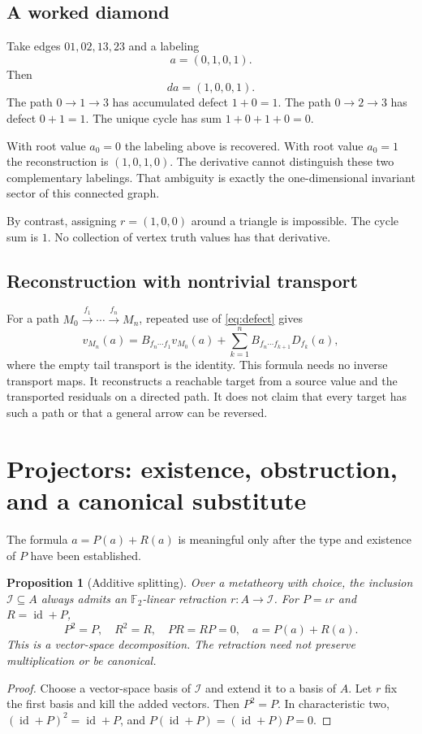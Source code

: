 \documentclass[11pt,letterpaper]{article}
\newtheorem{proposition}[theorem]{Proposition}
\theoremstyle{definition}
\newcommand{\F}{\mathbb F_2}
\newcommand{\id}{\operatorname{id}}
\newcommand{\Inv}{\mathcal I}
\begin{document}
\subsection{A worked diamond}
Take edges $01,02,13,23$ and a labeling
\[
a=(0,1,0,1).
\]
Then
\[
da=(1,0,0,1).
\]
The path $0\to1\to3$ has accumulated defect $1+0=1$. The path $0\to2\to3$ has defect $0+1=1$. The unique cycle has sum $1+0+1+0=0$.

With root value $a_0=0$ the labeling above is recovered. With root value $a_0=1$ the reconstruction is $(1,0,1,0)$. The derivative cannot distinguish these two complementary labelings. That ambiguity is exactly the one-dimensional invariant sector of this connected graph.

By contrast, assigning $r=(1,0,0)$ around a triangle is impossible. The cycle sum is $1$. No collection of vertex truth values has that derivative.

\subsection{Reconstruction with nontrivial transport}
For a path $M_0\xrightarrow{f_1}\cdots\xrightarrow{f_n}M_n$, repeated use of \eqref{eq:defect} gives
\begin{equation}\label{eq:pathreconstruction}
v_{M_n}(a)=B_{f_n\cdots f_1}v_{M_0}(a)
+\sum_{k=1}^n B_{f_n\cdots f_{k+1}}D_{f_k}(a),
\end{equation}
where the empty tail transport is the identity. This formula needs no inverse transport maps. It reconstructs a reachable target from a source value and the transported residuals on a directed path. It does not claim that every target has such a path or that a general arrow can be reversed.

\section{Projectors: existence, obstruction, and a canonical substitute}\label{sec:projectors}
The formula $a=P(a)+R(a)$ is meaningful only after the type and existence of $P$ have been established.

\begin{proposition}[Additive splitting]\label{prop:additivesplit}
Over a metatheory with choice, the inclusion $\Inv\subseteq A$ always admits an $\F$-linear retraction $r:A\to\Inv$. For $P=\iota r$ and $R=\id+P$,
\[
P^2=P,\quad R^2=R,\quad PR=RP=0,\quad a=P(a)+R(a).
\]
This is a vector-space decomposition. The retraction need not preserve multiplication or be canonical.
\end{proposition}
\begin{proof}
Choose a vector-space basis of $\Inv$ and extend it to a basis of $A$. Let $r$ fix the first basis and kill the added vectors. Then $P^2=P$. In characteristic two,
$(\id+P)^2=\id+P$, and $P(\id+P)=(\id+P)P=0$.
\end{proof}
\end{document}
